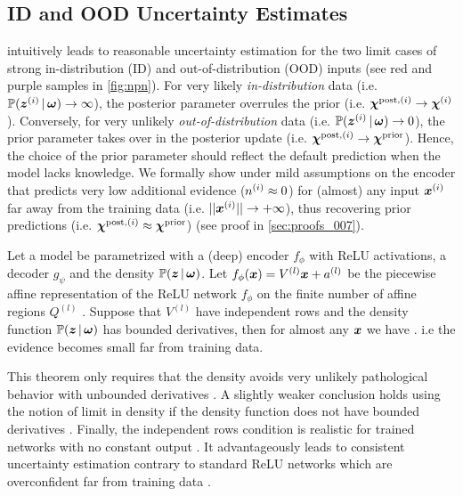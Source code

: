 \subsection{ID and OOD Uncertainty Estimates}
\NatPNacro{} intuitively leads to reasonable uncertainty estimation for the two limit cases of strong in-distribution (ID) and out-of-distribution (OOD) inputs (see red and purple samples in \cref{fig:npn}). For very likely \emph{in-distribution} data (i.e. $\operatorname{\mathbb{P}}(\bm{z}^{(i)} \,|\, \bm{\omega}) \rightarrow \infty$), the posterior parameter overrules the prior (i.e. $\bm{\chi}^{\text{post}, (i)} \rightarrow \bm{\chi}^{(i)}$). Conversely, for very unlikely \emph{out-of-distribution} data (i.e. $\operatorname{\mathbb{P}}(\bm{z}^{(i)} \,|\, \bm{\omega}) \rightarrow 0$), the prior parameter takes over in the posterior update (i.e. $\bm{\chi}^{\text{post}, (i)} \rightarrow \bm{\chi}^\text{prior}$). Hence, the choice of the prior parameter should reflect the default prediction when the model lacks knowledge. We formally show under mild assumptions on the encoder that \NatPNacro{} predicts very low additional evidence ($n^{(i)} \approx 0$) for (almost) any input $\bm{x}^{(i)}$ far away from the training data (i.e. $||\bm{x}^{(i)}|| \rightarrow + \infty$), thus recovering prior predictions (i.e. $\bm{\chi}^{\text{post}, (i)} \approx \bm{\chi}^\text{prior}$) (see proof in \cref{sec:proofs_007}).
\begin{theorem}
\label{thm:oodom-guarantee}
Let a \NatPNacro{} model be parametrized with a (deep) encoder $f_{\phi}$ with ReLU activations, a decoder $g_{\psi}$ and the density $\operatorname{\mathbb{P}}(\bm{z} \,|\, \bm{\omega})$. Let $f_{\phi}(\bm{x})= V^{(l)}\bm{x} + a^{(l)}$ be the piecewise affine representation of the ReLU network $f_{\phi}$ on the finite number of affine regions $Q^{(l)}$ \citep{understanding-nn-relu}. Suppose that $V^{(l)}$ have independent rows and the density function $\operatorname{\mathbb{P}}(\bm{z} \,|\, \bm{\omega})$ has bounded derivatives, then for almost any $\bm{x}$ we have . i.e the evidence becomes small far from training data.
\end{theorem}
This theorem only requires that the density avoids very unlikely pathological behavior with unbounded derivatives \citep{limit-existence-infinity}. A slightly weaker conclusion holds using the notion of limit in density if the density function does not have bounded derivatives \citep{integrable-infinity}. Finally, the independent rows condition is realistic for trained networks with no constant output \citep{overconfident-relu}. It advantageously leads \NatPNacro{} to consistent uncertainty estimation contrary to standard ReLU networks which are overconfident far from training data \citep{overconfident-relu}.

